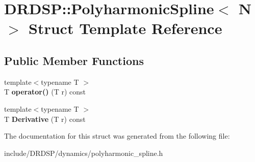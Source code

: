 \hypertarget{struct_d_r_d_s_p_1_1_polyharmonic_spline}{\section{D\-R\-D\-S\-P\-:\-:Polyharmonic\-Spline$<$ N $>$ Struct Template Reference}
\label{struct_d_r_d_s_p_1_1_polyharmonic_spline}
}
\subsection*{Public Member Functions}
\begin{DoxyCompactItemize}
\item 
\hypertarget{struct_d_r_d_s_p_1_1_polyharmonic_spline_a2ebd78e3db5b52236072e82e2c276d31}{{\footnotesize template$<$typename T $>$ }\\T {\bfseries operator()} (T r) const }\label{struct_d_r_d_s_p_1_1_polyharmonic_spline_a2ebd78e3db5b52236072e82e2c276d31}

\item 
\hypertarget{struct_d_r_d_s_p_1_1_polyharmonic_spline_aa81c69a1ca35f1d31d9c18abc312ba3e}{{\footnotesize template$<$typename T $>$ }\\T {\bfseries Derivative} (T r) const }\label{struct_d_r_d_s_p_1_1_polyharmonic_spline_aa81c69a1ca35f1d31d9c18abc312ba3e}

\end{DoxyCompactItemize}


The documentation for this struct was generated from the following file\-:\begin{DoxyCompactItemize}
\item 
include/\-D\-R\-D\-S\-P/dynamics/polyharmonic\-\_\-spline.\-h\end{DoxyCompactItemize}
